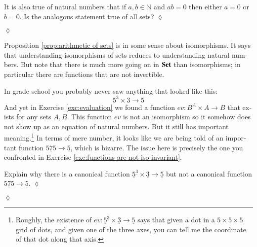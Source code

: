 \documentclass[a4paper]{book}
\def\NN{{\mathbb N}}
\def\to{\rightarrow}
\def\taking{\colon}
\def\too{\longrightarrow}
\def\ul{\underline}
\def\Set{{\bf Set}}
\theoremstyle{myth}
\newtheorem{excENG}[envENG]{\begin{english}Exercise\end{english}}
\newenvironment{exerciseENG}{\begin{excENG}}{\hspace*{\fill}$\lozenge$\end{excENG}}
\newtheorem{excRUS}[envRUS]{\begin{russian}Упражнение\end{russian}}
\newenvironment{exerciseRUS}{\begin{excRUS}}{\hspace*{\fill}$\lozenge$\end{excRUS}}
\begin{document}
\begin{english}
\begin{exerciseENG}
It is also true of natural numbers that if $a,b\in\NN$ and $ab=0$ then either $a=0$ or $b=0$. Is the analogous statement true of all sets?
\end{exerciseENG}

\begin{exerciseRUS}
\begin{russian} \end{russian}
\end{exerciseRUS}

Proposition \ref{prop:arithmetic of sets} is in some sense about isomorphisms. It says that understanding isomorphisms of sets reduces to understanding natural numbers. But note that there is much more going on in $\Set$ than isomorphisms; in particular there are functions that are not invertible. 

\begin{russian} \end{russian}

In grade school you probably never saw anything that looked like this:
$$5^3\times 3\too 5$$
And yet in Exercise \ref{exc:evaluation} we found a function $ev\taking B^A\times A\to B$ that exists for any sets $A,B$. This function $ev$ is not an isomorphism so it somehow does not show up as an equation of natural numbers. But it still has important meaning.\footnote{Roughly, the existence of $ev\taking\ul{5}^{\ul{3}}\times\ul{3}\too \ul{5}$ says that given a dot in a $5\times 5\times 5$ grid of dots, and given one of the three axes, you can tell me the coordinate of that dot along that axis.} In terms of mere number, it looks like we are being told of an important function $\ul{575}\to\ul{5}$, which is bizarre. The issue here is precisely the one you confronted in Exercise \ref{exc:functions are not iso invariant}.

\begin{russian} \end{russian}

\begin{exerciseENG}
Explain why there is a canonical function $\ul{5}^{\ul{3}}\times\ul{3}\too \ul{5}$ but not a canonical function $\ul{575}\to\ul{5}$.
\end{exerciseENG}

\begin{exerciseRUS}
\begin{russian} \end{russian}
\end{exerciseRUS}


\end{english}
\end{document}
